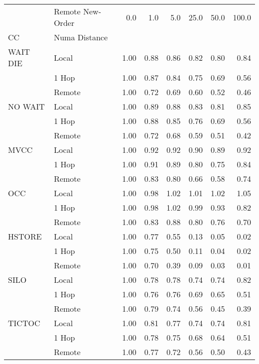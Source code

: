 \begin{tabular}{llrrrrrr}
\toprule
       & Remote New-Order &  0.0   &  1.0   &  5.0   &  25.0  &  50.0  &  100.0 \\
CC & Numa Distance &        &        &        &        &        &        \\
\midrule
WAIT DIE & Local &   1.00 &   0.88 &   0.86 &   0.82 &   0.80 &   0.84 \\
       & 1 Hop &   1.00 &   0.87 &   0.84 &   0.75 &   0.69 &   0.56 \\
       & Remote &   1.00 &   0.72 &   0.69 &   0.60 &   0.52 &   0.46 \\
NO WAIT & Local &   1.00 &   0.89 &   0.88 &   0.83 &   0.81 &   0.85 \\
       & 1 Hop &   1.00 &   0.88 &   0.85 &   0.76 &   0.69 &   0.56 \\
       & Remote &   1.00 &   0.72 &   0.68 &   0.59 &   0.51 &   0.42 \\
MVCC & Local &   1.00 &   0.92 &   0.92 &   0.90 &   0.89 &   0.92 \\
       & 1 Hop &   1.00 &   0.91 &   0.89 &   0.80 &   0.75 &   0.84 \\
       & Remote &   1.00 &   0.83 &   0.80 &   0.66 &   0.58 &   0.74 \\
OCC & Local &   1.00 &   0.98 &   1.02 &   1.01 &   1.02 &   1.05 \\
       & 1 Hop &   1.00 &   0.98 &   1.02 &   0.99 &   0.93 &   0.82 \\
       & Remote &   1.00 &   0.83 &   0.88 &   0.80 &   0.76 &   0.70 \\
HSTORE & Local &   1.00 &   0.77 &   0.55 &   0.13 &   0.05 &   0.02 \\
       & 1 Hop &   1.00 &   0.75 &   0.50 &   0.11 &   0.04 &   0.02 \\
       & Remote &   1.00 &   0.70 &   0.39 &   0.09 &   0.03 &   0.01 \\
SILO & Local &   1.00 &   0.78 &   0.78 &   0.74 &   0.74 &   0.82 \\
       & 1 Hop &   1.00 &   0.76 &   0.76 &   0.69 &   0.65 &   0.51 \\
       & Remote &   1.00 &   0.79 &   0.74 &   0.56 &   0.45 &   0.39 \\
TICTOC & Local &   1.00 &   0.81 &   0.77 &   0.74 &   0.74 &   0.81 \\
       & 1 Hop &   1.00 &   0.78 &   0.75 &   0.68 &   0.64 &   0.51 \\
       & Remote &   1.00 &   0.77 &   0.72 &   0.56 &   0.50 &   0.43 \\
\bottomrule
\end{tabular}
